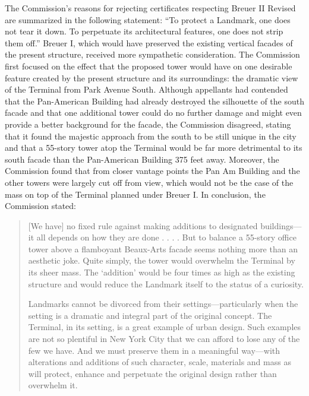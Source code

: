 The Commission's reasons for rejecting certificates respecting Breuer II Revised
are summarized in the following statement: ``To protect a Landmark, one does not
tear it down. To perpetuate its architectural features, one does not strip them
off.'' Breuer I, which would have preserved the existing vertical facades of the
present structure, received more sympathetic consideration. The Commission first
focused on the effect that the proposed tower would have on one desirable
feature created by the present structure and its surroundings: the dramatic view
of the Terminal from Park Avenue South. Although appellants had contended that
the Pan-American Building had already destroyed the silhouette of the south
facade and that one additional tower could do no further damage and might even
provide a better background for the facade, the Commission disagreed, stating
that it found the majestic approach from the south to be still unique in the
city and that a 55-story tower atop the Terminal would be far more detrimental
to its south facade than the Pan-American Building 375 feet away. Moreover, the
Commission found that from closer vantage points the Pan Am Building and the
other towers were largely cut off from view, which would not be the case of the
mass on top of the Terminal planned under Breuer I. In conclusion, the
Commission stated:
\begin{quotation}
[We have] no fixed rule against making additions to designated buildings---it
all depends on how they are done . . . . But to balance a 55-story office tower
above a flamboyant Beaux-Arts facade seems nothing more than an aesthetic joke.
Quite simply, the tower would overwhelm the Terminal by its sheer mass. The
`addition' would be four times as high as the existing structure and would
reduce the Landmark itself to the status of a curiosity.

Landmarks cannot be divorced from their settings---particularly when the
setting is a dramatic and integral part of the original concept. The Terminal,
in its setting, is a great example of urban design. Such examples are not so
plentiful in New York City that we can afford to lose any of the few we have.
And we must preserve them in a meaningful way---with alterations and additions
of such character, scale, materials and mass as will protect, enhance and
perpetuate the original design rather than overwhelm it.
\end{quotation}

